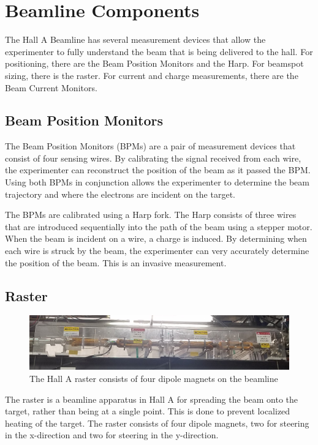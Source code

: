 \section{Beamline Components}

The Hall A Beamline has several measurement devices that allow the experimenter to fully understand the beam that is being delivered to the hall. For positioning, there are the Beam Position Monitors and the Harp. For beamspot sizing, there is the raster. For current and charge measurements, there are the Beam Current Monitors.

\subsection{Beam Position Monitors}

The Beam Position Monitors (BPMs) are a pair of measurement devices that consist of four sensing wires. By calibrating the signal received from each wire, the experimenter can reconstruct the position of the beam as it passed the BPM. Using both BPMs in conjunction allows the experimenter to determine the beam trajectory and where the electrons are incident on the target.

The BPMs are calibrated using a Harp fork. The Harp consists of three wires that are introduced sequentially into the path of the beam using a stepper motor. When the beam is incident on a wire, a charge is induced. By determining when each wire is struck by the beam, the experimenter can very accurately determine the position of the beam. This is an invasive measurement.

\subsection{Raster}
\begin{figure}
	\includegraphics[width=\linewidth]{./chap2-exp/fig/raster_pic.jpg}
	\caption{The Hall A raster consists of four dipole magnets on the beamline}
	\label{fig:raster}
\end{figure}

The raster is a beamline apparatus in Hall A for spreading the beam onto the target, rather than being at a single point. This is done to prevent localized heating of the target. The raster consists of four dipole magnets, two for steering in the x-direction and two for steering in the y-direction.

